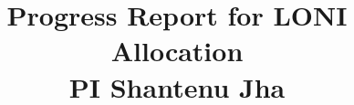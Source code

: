 \documentclass[a4paper,10pt]{article}
\newcommand{\up}{\vspace*{-1em}}
\begin{document}
\title{\LARGE %
  Progress Report for LONI Allocation \\ PI Shantenu Jha }


\newif\ifdraft
\drafttrue
\ifdraft
\newcommand{\amnote}[1]{ {\textcolor{magenta} { ***AM: #1c }}}
\newcommand{\jhanote}[1]{ {\textcolor{red} { ***SJ: #1 }}}
\newcommand{\michaelnote}[1]{ {\textcolor{blue} { ***MM: #1 }}}
\newcommand{\yyenote}[1]{ {\textcolor{green} { ***YYE: #1 }}}
\else
\newcommand{\amnote}[1]{}
\newcommand{\jhanote}[1]{}
\newcommand{\michaelnote}[1]{ {\textcolor{blue} { ***MM: #1 }}}
\newcommand{\yyenote}[1]{ {}}
\fi


\date{}

\maketitle
\up\up\up\up





\end{document}

